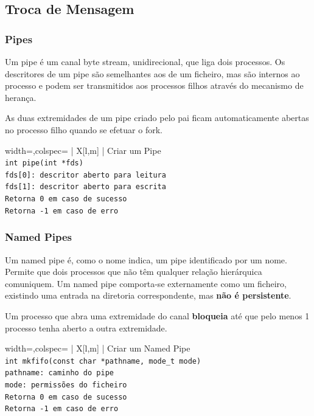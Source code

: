 \documentclass[11pt]{article}
\begin{document}
\newpage

\subsection{Troca de Mensagem}

\subsubsection{Pipes}

Um pipe é um canal byte stream, unidirecional, que liga dois processos. Os descritores de um pipe são semelhantes aos de um ficheiro, mas são internos ao processo e podem ser transmitidos aos processos filhos através do mecanismo de herança.

As duas extremidades de um pipe criado pelo pai ficam automaticamente abertas no processo filho quando se efetuar o fork.

\begin{tblr}{width=\linewidth,colspec={ | X[l,m] | }}
    \hline
    \centering Criar um Pipe                          \\\hline
    \lstinline|int pipe(int *fds)|                    \\\hline
    \lstinline|fds[0]: descritor aberto para leitura| \\
    \lstinline|fds[1]: descritor aberto para escrita| \\\hline
    \lstinline|Retorna 0 em caso de sucesso|          \\
    \lstinline|Retorna -1 em caso de erro|            \\\hline
\end{tblr}

\subsubsection{Named Pipes}
Um named pipe é, como o nome indica, um pipe identificado por um nome. Permite que dois processos que não têm qualquer relação hierárquica comuniquem. Um named pipe comporta-se externamente como um ficheiro, existindo uma entrada na diretoria correspondente, mas \textbf{não é persistente}.

Um processo que abra uma extremidade do canal \textbf{bloqueia} até que pelo menos 1 processo tenha aberto a outra extremidade.

\begin{tblr}{width=\linewidth,colspec={ | X[l,m] | }}
    \hline
    \centering Criar um Named Pipe                            \\\hline
    \lstinline|int mkfifo(const char *pathname, mode_t mode)| \\\hline
    \lstinline|pathname: caminho do pipe|                     \\
    \lstinline|mode: permissões do ficheiro|                  \\\hline
    \lstinline|Retorna 0 em caso de sucesso|                  \\
    \lstinline|Retorna -1 em caso de erro|                    \\\hline
\end{tblr}
\end{document}
